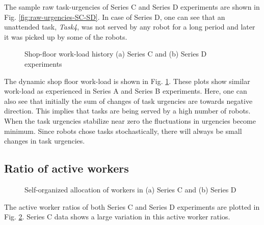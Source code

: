 The sample raw task-urgencies of Series C and Series D experiments are shown in Fig. \ref{fig:raw-urgencies-SC-SD}. In case of Series D, one can see that an unattended task, \textit{Task4}, was not served by any robot for a long period and later it was picked up by some of the robots. 

\begin{figure}[H]
\centering
\hspace*{0.5cm}
\newline
{}
\caption{\small Shop-floor work-load history (a) Series C and (b) Series D experiments}
\label{fig:workload-SC-SD} 
\end{figure}
The dynamic shop floor work-load is shown in Fig. \ref{fig:workload-SC-SD}. These plots show similar work-load as experienced in Series A and Series B experiments. Here, one can also see that initially the sum of changes of task urgencies are towards negative direction. This implies that tasks are being served by a high number of robots. When the task urgencies stabilize near zero the fluctuations in urgencies become minimum. Since robots chose tasks stochastically, there will always be  small changes in task urgencies.
%
\subsection*{Ratio of active workers}
\begin{figure}[H]
\centering
\hspace*{0.5cm}
\newline
{}
\caption{\small Self-organized allocation of workers in (a) Series C and (b) Series D}
\label{fig:plasticity-SC-SD} 
\end{figure}
%
The active worker ratios of both Series C and Series D experiments are plotted in Fig. \ref{fig:plasticity-SC-SD}. Series C data shows a large variation in this active worker ratios.

